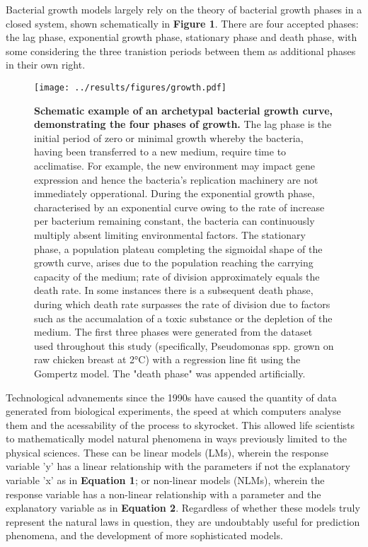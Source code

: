 \documentclass[11pt]{article}
\begin{document}
Bacterial growth models largely rely on the theory of bacterial growth phases in a closed system, shown schematically in \textbf{Figure 1}. There are four accepted phases: the lag phase, exponential growth phase, stationary phase and death phase, with some considering the three tranistion periods between them as additional phases in their own right.\parencite{Buchanan1918}

\vspace{5mm}
\begin{figure}[htb]
    \centering
    \texttt{[image: ../results/figures/growth.pdf]}
    \caption{\textbf{Schematic example of an archetypal bacterial growth curve, demonstrating the four phases of growth.}  The lag phase is the initial period of zero or minimal growth whereby the bacteria, having been transferred to a new medium, require time to acclimatise. For example, the new environment may impact gene expression and hence the bacteria's replication machinery are not immediately opperational.\parencite{Buchanan1918} During the exponential growth phase, characterised by an exponential curve owing to the rate of increase per bacterium remaining constant, the bacteria can continuously multiply absent limiting environmental factors.\parencite{Micha2011} The stationary phase, a population plateau completing the sigmoidal shape of the growth curve, arises due to the population reaching the carrying capacity of the medium; rate of division approximately equals the death rate.\parencite{Buchanan1918} In some instances there is a subsequent death phase, during which death rate surpasses the rate of division due to factors such as the accumalation of a toxic substance or the depletion of the medium.\parencite{Micha2011, Buchanan1918}
    The first three phases were generated from the dataset used throughout this study (specifically, Pseudomonas spp. grown on raw chicken breast at 2°C) with a regression line fit using the Gompertz model. The "death phase" was appended artificially.}
\end{figure}
\vspace{5mm}

Technological advanements since the 1990s have caused the quantity of data generated from biological experiments, the speed at which computers analyse them and the acessability of the process to skyrocket. This allowed life scientists to mathematically model natural phenomena in ways previously limited to the physical sciences.\parencite{Bolker2013,Johnson2004} These can be linear models (LMs), wherein the response variable 'y' has a linear relationship with the parameters if not the explanatory variable 'x' as in \textbf{Equation 1}; or non-linear models (NLMs), wherein the response variable has a non-linear relationship with a parameter and the explanatory variable as in \textbf{Equation 2}.\parencite{Bolker2013} Regardless of whether these models truly represent the natural laws in question, they are undoubtably useful for prediction phenomena, and the development of more sophisticated models.\parencite{Transtrum2016}
\end{document}
